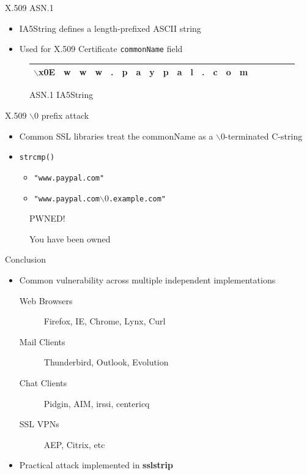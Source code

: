 \documentclass{beamer}
\begin{document}
\begin{frame}{X.509 ASN.1}
  \begin{itemize}
    \item IA5String defines a length-prefixed ASCII string
    \item Used for X.509 Certificate \texttt{commonName} field
  \end{itemize}
  \begin{figure}
    \begin{tabular}{*{20}{|c}}
      \hline
      $\backslash$x0E & w & w & w & . & p & a & y & p & a & l & . & c & o & m \\
      \hline 
    \end{tabular}
    \caption{ASN.1 IA5String}
  \end{figure}
\end{frame}

\begin{frame}{X.509 $\backslash0$ prefix attack}
  \begin{itemize}
    \item Common SSL libraries treat the commonName as a $\backslash0$-terminated C-string
    \item \texttt{strcmp()}
      \begin{itemize}
        \item \texttt{"www.paypal.com"}  
        \item \texttt{"www.paypal.com$\backslash0$.example.com"}
      \end{itemize} 
  \end{itemize}
  \begin{figure}
    \centering
    \Huge{PWNED!}
    \caption{You have been owned}
  \end{figure}
\end{frame}

\begin{frame}[fragile]{Conclusion}
  \begin{itemize}
    \item Common vulnerability across multiple independent implementations
    \begin{description}
      \item[Web Browsers] Firefox, IE, Chrome, Lynx, Curl
      \item[Mail Clients] Thunderbird, Outlook, Evolution
      \item[Chat Clients] Pidgin, AIM, irssi, centericq
      \item[SSL VPNs] AEP, Citrix, etc
    \end{description}
    \item Practical attack implemented in \textbf{sslstrip}
  \end{itemize}
\end{frame}
\end{document}
